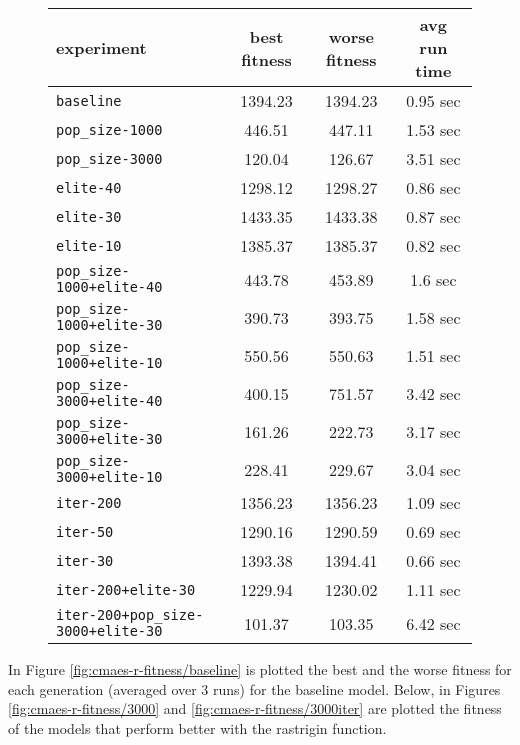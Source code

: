\begin{figure}[htb]
	\centering
	
	\begin{tabular}{lccc}
		\toprule
		\textbf{experiment} & \textbf{best fitness} & \textbf{worse fitness} & \textbf{avg run time} \\
		\midrule
		\texttt{baseline 						}		&              1394.23 &	1394.23 &	  0.95 sec \\
		\texttt{pop\_size-1000 					}		&	446.51 &	 447.11 &	  1.53 sec \\
		\texttt{pop\_size-3000 					}		&	120.04 &	 126.67 &	  3.51 sec \\
		\texttt{elite-40 						}		&              1298.12 &	1298.27 &	  0.86 sec \\
		\texttt{elite-30 						}		&              1433.35 &	1433.38 &	  0.87 sec \\
		\texttt{elite-10 						}		&              1385.37 &	1385.37 &	  0.82 sec \\
		\texttt{pop\_size-1000+elite-40 		}	 &	443.78 &	 453.89 &	   1.6 sec \\
		\texttt{pop\_size-1000+elite-30 		}	 &	390.73 &	 393.75 &	  1.58 sec \\
		\texttt{pop\_size-1000+elite-10 		}	 &	550.56 &	 550.63 &	  1.51 sec \\
		\texttt{pop\_size-3000+elite-40 		}	 &	400.15 &	 751.57 &	  3.42 sec \\
		\texttt{pop\_size-3000+elite-30 		}	 &	161.26 &	 222.73 &	  3.17 sec \\
		\texttt{pop\_size-3000+elite-10 		}	 &	228.41 &	 229.67 &	  3.04 sec \\
		\texttt{iter-200 						}		&              1356.23 &	1356.23 &	  1.09 sec \\
		\texttt{iter-50 						}		 &              1290.16 &	1290.59 &	  0.69 sec \\
		\texttt{iter-30 						}		 &              1393.38 &	1394.41 &	  0.66 sec \\
		\texttt{iter-200+elite-30 				}	&              1229.94 &	1230.02 &	  1.11 sec \\
		\texttt{iter-200+pop\_size-3000+elite-30} 	 &	101.37 &	 103.35 &	  6.42 sec \\
		\bottomrule
	\end{tabular}
	\label{tab:cmaes-performance-r}
\end{figure}


In Figure \ref{fig:cmaes-r-fitness/baseline} is plotted the best and the worse fitness for each generation (averaged over 3 runs) for the baseline model. Below, in Figures \ref{fig:cmaes-r-fitness/3000} and \ref{fig:cmaes-r-fitness/3000iter} are plotted the fitness of the models that perform better with the rastrigin function.

